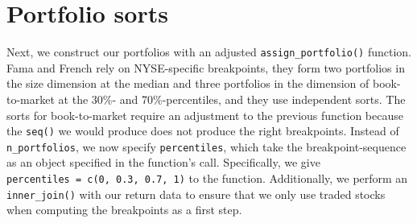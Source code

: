 \documentclass[
]{krantz}
\begin{document}
\hypertarget{portfolio-sorts}{%
\section{Portfolio sorts}\label{portfolio-sorts}}

Next, we construct our portfolios with an adjusted \texttt{assign\_portfolio()} function. Fama and French rely on NYSE-specific breakpoints, they form two portfolios in the size dimension at the median and three portfolios in the dimension of book-to-market at the 30\%- and 70\%-percentiles, and they use independent sorts. The sorts for book-to-market require an adjustment to the previous function because the \texttt{seq()} we would produce does not produce the right breakpoints. Instead of \texttt{n\_portfolios}, we now specify \texttt{percentiles}, which take the breakpoint-sequence as an object specified in the function's call. Specifically, we give \texttt{percentiles\ =\ c(0,\ 0.3,\ 0.7,\ 1)} to the function. Additionally, we perform an \texttt{inner\_join()} with our return data to ensure that we only use traded stocks when computing the breakpoints as a first step.
\end{document}
